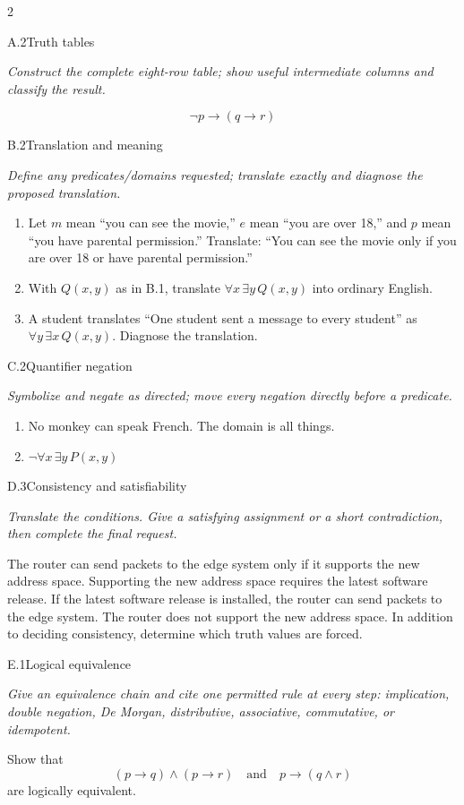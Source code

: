 \documentclass[9pt]{extarticle}
\begin{document}
\begin{multicols}{2}
\begin{CoreProblem}{A.2}{Truth tables}
{\scriptsize\textit{Construct the complete eight-row table; show useful intermediate columns and classify the result.}\par}
\[
  \neg p\to(q\to r)
\]
\end{CoreProblem}
\begin{CoreProblem}{B.2}{Translation and meaning}
{\scriptsize\textit{Define any predicates/domains requested; translate exactly and diagnose the proposed translation.}\par}
\begin{enumerate}[label=(\alph*)]
  \item Let $m$ mean ``you can see the movie,'' $e$ mean ``you are over 18,''
        and $p$ mean ``you have parental permission.'' Translate: ``You can
        see the movie only if you are over 18 or have parental permission.''
  \item With $Q(x,y)$ as in B.1, translate $\forall x\,\exists y\,Q(x,y)$
        into ordinary English.
  \item A student translates ``One student sent a message to every student''
        as $\forall y\,\exists x\,Q(x,y)$. Diagnose the translation.
\end{enumerate}
\end{CoreProblem}
\begin{CoreProblem}{C.2}{Quantifier negation}
{\scriptsize\textit{Symbolize and negate as directed; move every negation directly before a predicate.}\par}
\begin{enumerate}[label=(\alph*)]
  \item No monkey can speak French. The domain is all things.
  \item $\neg\forall x\,\exists y\,P(x,y)$
\end{enumerate}
\end{CoreProblem}
\columnbreak
\begin{CoreProblem}{D.3}{Consistency and satisfiability}
{\scriptsize\textit{Translate the conditions. Give a satisfying assignment or a short contradiction, then complete the final request.}\par}
The router can send packets to the edge system only if it supports the new
address space. Supporting the new address space requires the latest software
release. If the latest software release is installed, the router can send
packets to the edge system. The router does not support the new address space.
In addition to deciding consistency, determine which truth values are forced.
\end{CoreProblem}
\begin{CoreProblem}{E.1}{Logical equivalence}
{\scriptsize\textit{Give an equivalence chain and cite one permitted rule at every step: implication, double negation, De Morgan, distributive, associative, commutative, or idempotent.}\par}
Show that
\[
  (p\to q)\land(p\to r)
  \quad\text{and}\quad
  p\to(q\land r)
\]
are logically equivalent.
\end{CoreProblem}
\end{multicols}
\end{document}
